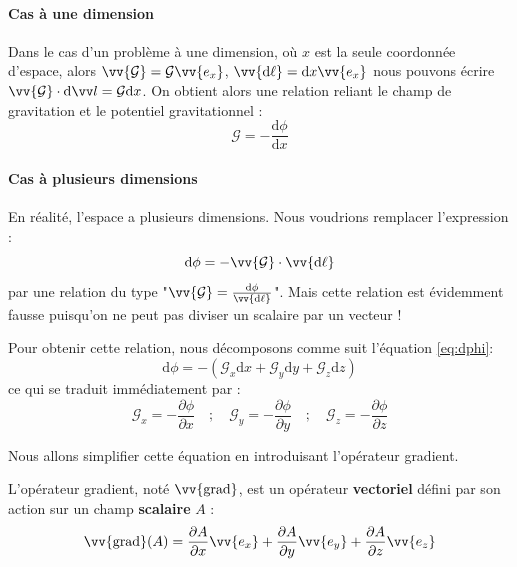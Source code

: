 \documentclass[11pt,fleqn]{book} %
\newcommand{\dd}{\mathrm{d}}
\newcommand{\grad}{\vv{\mathrm{grad}}}
\begin{document}
\paragraph{Cas à une dimension}
Dans le cas d'un problème à une dimension, où $x$ est la seule coordonnée d'espace, alors $\vv{\mathcal{G}}  = \mathcal{G} \vv{e_x}$, $\vv{\dd \ell} = \dd x \vv{e_x}$ nous pouvons écrire $\vv{\mathcal{G}} \cdot \mathrm{d} \vv l = \mathcal{G} \dd x$. On obtient alors une relation reliant le champ de gravitation et le potentiel gravitationnel :
\begin{equation}
    \mathcal{G} = - \frac{\dd \phi}{\dd x}
\end{equation}

\paragraph{Cas à plusieurs dimensions}
En réalité, l'espace a plusieurs dimensions. Nous voudrions remplacer l'expression :
\begin{equation}
    \mathrm{d} \phi = - \vv{\mathcal{G}} \cdot \vv{\dd \ell}
    \label{eq:dphi}
\end{equation}
par une relation du type "$\vv{\mathcal{G}} = \frac{\dd \phi}{\vv{\dd \ell}}$". Mais cette relation est évidemment fausse puisqu'on ne peut pas diviser un scalaire par un vecteur !

Pour obtenir cette relation, nous décomposons comme suit l'équation \ref{eq:dphi}:
\begin{equation}
    \mathrm{d} \phi = - (\mathcal{G}_x \dd x + \mathcal{G}_y \dd y + \mathcal{G}_z \dd z)
\end{equation}
ce qui se traduit immédiatement par :
\begin{equation}
    \mathcal{G}_x = -\frac{\partial \phi}{\partial x} \quad ; \quad \mathcal{G}_y = -\frac{\partial \phi}{\partial y} \quad ; \quad \mathcal{G}_z = -\frac{\partial \phi}{\partial z} 
\end{equation}

Nous allons simplifier cette équation en introduisant l'opérateur gradient.

\begin{definition}
    L'opérateur gradient, noté $\grad$, est un opérateur \textbf{vectoriel} défini par son action sur un champ \textbf{scalaire} $A$ :
    \begin{equation}
        \grad(A) = \frac{\partial A}{\partial x} \vv{e_x} + \frac{\partial A}{\partial y} \vv{e_y} + \frac{\partial A}{\partial z} \vv{e_z}
    \end{equation}
\end{definition}
\end{document}
